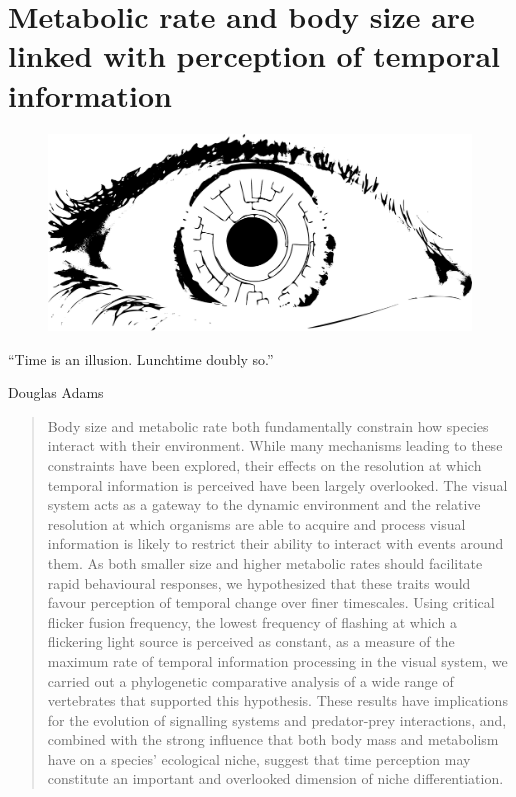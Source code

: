 \chapter[Flicker fusion]{Metabolic rate and body size are linked with perception of temporal information}
\label{chap:CFF}


\begin{figure}[h]
  \centering
  \includegraphics[width=.45\textwidth]{ch2-time/eyepic.png}
\end{figure}

\begin{quoteshrink}
  ``Time is an illusion. Lunchtime doubly so.''

\hfill{Douglas Adams}
\end{quoteshrink}



\begin{abstract}
Body size and metabolic rate both fundamentally constrain how species interact with their environment. While many mechanisms leading to these constraints have been explored, their effects on the resolution at which temporal information is perceived have been largely overlooked. The visual system acts as a gateway to the dynamic environment and the relative resolution at which organisms are able to acquire and process visual information is likely to restrict their ability to interact with events around them. As both smaller size and higher metabolic rates should facilitate rapid behavioural responses, we hypothesized that these traits would favour perception of temporal change over finer timescales. Using critical flicker fusion frequency, the lowest frequency of flashing at which a flickering light source is perceived as constant, as a measure of the maximum rate of temporal information processing in the visual system, we carried out a phylogenetic comparative analysis of a wide range of vertebrates that supported this hypothesis. These results have implications for the evolution of signalling systems and predator-prey interactions, and, combined with the strong influence that both body mass and metabolism have on a species' ecological niche, suggest that time perception may constitute an important and overlooked dimension of niche differentiation.
\end{abstract}

